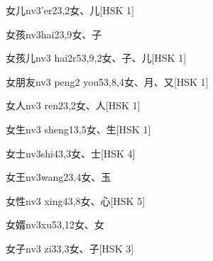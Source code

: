 \begin{EntryWithPhonetic}{女儿}{nv3'er2}{3,2}{⼥、⼉}[HSK 1]
\end{EntryWithPhonetic}

\begin{EntryWithPhonetic}{女孩}{nv3hai2}{3,9}{⼥、⼦}
\end{EntryWithPhonetic}

\begin{EntryWithPhonetic}{女孩儿}{nv3 hai2r5}{3,9,2}{⼥、⼦、⼉}[HSK 1]
\end{EntryWithPhonetic}

\begin{EntryWithPhonetic}{女朋友}{nv3 peng2 you5}{3,8,4}{⼥、⽉、⼜}[HSK 1]
\end{EntryWithPhonetic}

\begin{EntryWithPhonetic}{女人}{nv3 ren2}{3,2}{⼥、⼈}[HSK 1]
\end{EntryWithPhonetic}

\begin{EntryWithPhonetic}{女生}{nv3 sheng1}{3,5}{⼥、⽣}[HSK 1]
\end{EntryWithPhonetic}

\begin{EntryWithPhonetic}{女士}{nv3shi4}{3,3}{⼥、⼠}[HSK 4]
\end{EntryWithPhonetic}

\begin{EntryWithPhonetic}{女王}{nv3wang2}{3,4}{⼥、⽟}
\end{EntryWithPhonetic}

\begin{EntryWithPhonetic}{女性}{nv3 xing4}{3,8}{⼥、⼼}[HSK 5]
\end{EntryWithPhonetic}

\begin{EntryWithPhonetic}{女婿}{nv3xu5}{3,12}{⼥、⼥}
\end{EntryWithPhonetic}

\begin{EntryWithPhonetic}{女子}{nv3 zi3}{3,3}{⼥、⼦}[HSK 3]
\end{EntryWithPhonetic}


